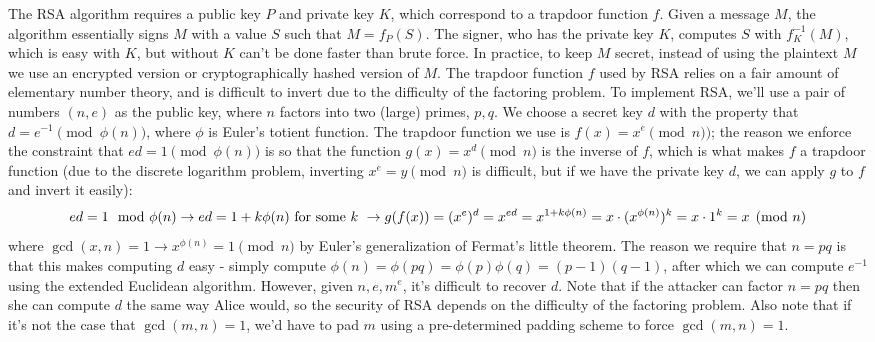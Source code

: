 \documentclass{article}
\begin{document}
\newline \newline
The RSA algorithm requires a public key $ P $ and private key $ K $, which correspond to a trapdoor function $ f $. Given a message $ M $, the algorithm essentially signs $ M $ with a value $ S $ such that $ M = f_P (S) $. The signer, who has the private key $ K $, computes $ S $ with $ f^{-1}_{K} (M) $, which is easy with $ K $, but without $ K $ can't be done faster than brute force. In practice, to keep $ M $ secret, instead of using the plaintext $ M $ we use an encrypted version or cryptographically hashed version of $ M $. The trapdoor function $ f $ used by RSA relies on a fair amount of elementary number theory, and is difficult to invert due to the difficulty of the factoring problem.
\newline
To implement RSA, we'll use a pair of numbers $ (n, e) $ as the public key, where $ n $ factors into two (large) primes, $ p, q $. We choose a secret key $ d $ with the property that $ d = e^{-1} \pmod{\phi(n)} $, where $ \phi $ is Euler's totient function. The trapdoor function we use is $ f(x) = x^e \pmod n) $; the reason we enforce the constraint that $ e d = 1 \pmod{\phi(n)} $ is so that the function $ g(x) = x^d \pmod n $ is the inverse of $ f $, which is what makes $ f $ a trapdoor function (due to the discrete logarithm problem, inverting $ x^e = y \pmod n $ is difficult, but if we have the private key $ d $, we can apply $ g $ to $ f $ and invert it easily):
$$ e d = 1 \mod \phi(n) \rightarrow ed = 1 + k \phi(n) \text{ for some $ k $ } \rightarrow g(f(x)) = (x^e)^d = x^{e d} = x^{1 + k \phi(n)} = x \cdot (x^{\phi(n)})^k = x \cdot 1^k = x \pmod n $$
where $ \gcd(x, n) = 1 \rightarrow x^{\phi(n)} = 1 \pmod n $ by Euler's generalization of Fermat's little theorem. The reason we require that $ n = p q $ is that this makes computing $ d $ easy - simply compute $ \phi(n) = \phi(p q) = \phi(p) \phi(q) = (p - 1)(q - 1) $, after which we can compute $ e^{-1} $ using the extended Euclidean algorithm. However, given $ n, e, m^e $, it's difficult to recover $ d $. Note that if the attacker can factor $ n = p q $ then she can compute $ d $ the same way Alice would, so the security of RSA depends on the difficulty of the factoring problem. Also note that if it's not the case that $ \gcd(m, n) = 1 $, we'd have to pad $ m $ using a pre-determined padding scheme to force $ \gcd(m, n) = 1 $.
\end{document}
